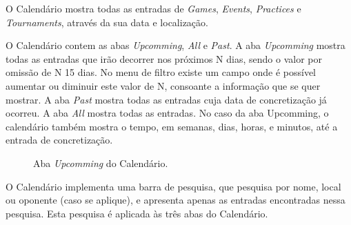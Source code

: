 O Calendário mostra todas as entradas de \textit{Games}, \textit{Events}, \textit{Practices} e \textit{Tournaments}, através da sua data e localização.

O Calendário contem as abas \textit{Upcomming}, \textit{All} e \textit{Past}. A aba \textit{Upcomming} mostra todas as entradas que irão decorrer nos próximos N dias, sendo o valor por omissão de N 15 dias. No menu de filtro existe um campo onde é possível aumentar ou diminuir este valor de N, consoante a informação que se quer mostrar. A aba \textit{Past} mostra todas as entradas cuja data de concretização já ocorreu. A aba \textit{All} mostra todas as entradas. No caso da aba Upcomming, o calendário também mostra o tempo, em semanas, dias, horas, e minutos, até a entrada de concretização.

\begin{figure}[h]
	\begin{center}
	\end{center}
	\caption{Aba \textit{Upcomming} do Calendário.}\label{fig:calendarupcomming}
\end{figure}

O Calendário implementa uma barra de pesquisa, que pesquisa por nome, local ou oponente (caso se aplique), e apresenta apenas as entradas encontradas nessa pesquisa. Esta pesquisa é aplicada às três abas do Calendário.

